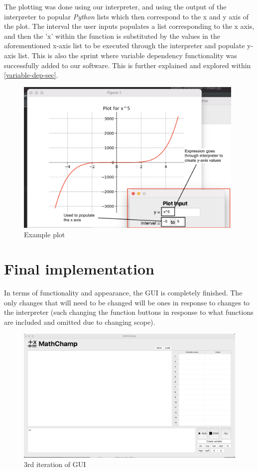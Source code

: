 \documentclass[a4paper, oneside, 11pt]{report}
\begin{document}
The plotting was done using our interpreter, and using the output of the interpreter to popular \emph{Python} lists which then correspond to the x and y axis of the plot. The interval the user inputs populates a list corresponding to the x axis, and then the 'x' within the function is substituted by the values in the aforementioned x-axis list to be executed through the interpreter and populate  y-axis list. This is also the sprint where variable dependency functionality was successfully added to our software. This is further explained and explored within \ref{variable-dep-sec}.

\begin{figure}[h!]
    \centering
    \includegraphics[width=11cm]{plot.png}
    \caption{Example plot}
    \label{fig:plot}
\end{figure}
\FloatBarrier

\newpage
\section{Final implementation}

In terms of functionality and appearance, the GUI is completely finished. The only changes that will need to be changed will be ones in response to changes to the interpreter (such changing the function buttons in response to what functions are included and omitted due to changing scope). 

\begin{figure}[H]
    \centering
    \includegraphics[width=13cm]{3rd_screenshot.png}
    \caption{3rd iteration of GUI}
    \label{fig:3rdGUI}
\end{figure}
\end{document}

